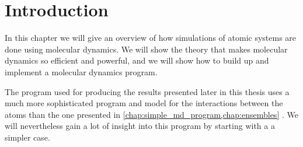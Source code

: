 \chapter*{Introduction}%
%
In this chapter we will give an overview of how simulations of atomic systems are done using molecular dynamics. We will show the theory that makes molecular dynamics so efficient and powerful, and we will show how to build up and implement a molecular dynamics program. 

The program used for producing the results presented later in this thesis uses a much more sophisticated program and model for the interactions between the atoms than the one presented in \cref{chap:simple_md_program,chap:ensembles}%
. %
We will nevertheless gain a lot of insight into this program by starting with a a simpler case.

% 
% 
% 
% 

